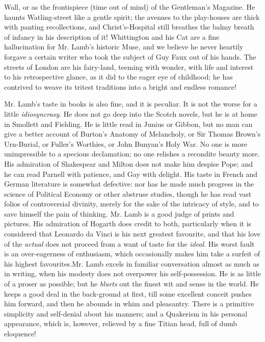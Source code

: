 Wall, or as the frontispiece (time out of mind) of the Gentleman's
Magazine. He haunts Watling-street like a gentle spirit; the
avenues to the play-houses are thick with panting recollections,
and Christ's-Hospital still breathes the balmy breath of infancy
in his description of it! Whittington and his Cat are a fine
hallucination for Mr. Lamb's historic Muse, and we believe he
never heartily forgave a certain writer who took the subject of
Guy Faux out of his hands. The streets of London are his
fairy-land, teeming with wonder, with life and interest to his
retrospective glance, as it did to the eager eye of childhood; he
has contrived to weave its tritest traditions into a bright and
endless romance!

Mr. Lamb's taste in books is also fine, and it is peculiar. It is
not the worse for a little \emph{idiosyncrasy}. He does not go
deep into the Scotch novels, but he is at home in Smollett and
Fielding. He is little read in Junius or Gibbon, but no man can
give a better account of Burton's Anatomy of Melancholy, or Sir
Thomas Brown's Urn-Burial, or Fuller's Worthies, or John Bunyan's
Holy War. No one is more unimpressible to a specious declamation;
no one relishes a recondite beauty more. His admiration of
Shakespear and Milton does not make him despise Pope; and he can
read Parnell with patience, and Gay with delight. His taste in
French and German literature is somewhat defective: nor has he
made much progress in the science of Political Economy or other
abstruse studies, though he has read vast folios of controversial
divinity, merely for the sake of the intricacy of style, and to
save himself the pain of thinking. Mr. Lamb is a good judge of
prints and pictures. His admiration of Hogarth does credit to
both, particularly when it is considered that Leonardo da Vinci is
his next greatest favourite, and that his love of the
\emph{actual} does not proceed from a want of taste for the
\emph{ideal}. His worst fault is an over-eagerness of enthusiasm,
which occasionally makes him take a surfeit of his highest
favourites.\textemdash Mr. Lamb excels in familiar conversation
almost as much as in writing, when his modesty does not overpower
his self-possession. He is as little of a proser as possible; but
he \emph{blurts} out the finest wit and sense in the world. He
keeps a good deal in the back-ground at first, till some excellent
conceit pushes him forward, and then he abounds in whim and
pleasantry. There is a primitive simplicity and self-denial about
his manners; and a Quakerism in his personal appearance, which is,
however, relieved by a fine Titian head, full of dumb eloquence!
